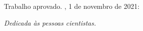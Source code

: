 
%
% 
%
\begin{folhadeaprovacao}

  \begin{center}
    {\ABNTEXchapterfont\large\imprimirautor}

    \vspace*{\fill}\vspace*{\fill}
    \begin{center}
      \ABNTEXchapterfont\bfseries\Large\imprimirtitulo
    \end{center}
    \vspace*{\fill}
    
    \hspace{.45\textwidth}
    \begin{minipage}{.5\textwidth}
        \imprimirpreambulo
    \end{minipage}%
    \vspace*{\fill}
   \end{center}
        
   Trabalho aprovado. \imprimirlocal, 1 de novembro de 2021:

      
   \begin{center}
    \vspace*{0.5cm}
    {\large\imprimirlocal}
    \par
    {\large\imprimirdata}
    \vspace*{1cm}
  \end{center}
  
\end{folhadeaprovacao}

\begin{dedicatoria}
   \vspace*{\fill}
   \centering
   \noindent
   \textit{Dedicada às pessoas cientistas.}\vspace*{\fill}
\end{dedicatoria}

